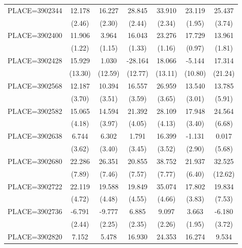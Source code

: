 {\begin{tabular}{l*{6}{c}}
PLACE=3902344       &      12.178&      16.227&      28.845&      33.910&      23.119&      25.437\\
                    &      (2.46)&      (2.30)&      (2.44)&      (2.34)&      (1.95)&      (3.74)\\
PLACE=3902400       &      11.906&       3.964&      16.043&      23.276&      17.729&      13.961\\
                    &      (1.22)&      (1.15)&      (1.33)&      (1.16)&      (0.97)&      (1.81)\\
PLACE=3902428       &      15.929&       1.030&     -28.164&      18.066&      -5.144&      17.314\\
                    &     (13.30)&     (12.59)&     (12.77)&     (13.11)&     (10.80)&     (21.24)\\
PLACE=3902568       &      12.187&      10.394&      16.557&      26.959&      13.540&      13.785\\
                    &      (3.70)&      (3.51)&      (3.59)&      (3.65)&      (3.01)&      (5.91)\\
PLACE=3902582       &      15.065&      14.594&      21.392&      28.109&      17.948&      24.564\\
                    &      (4.18)&      (3.97)&      (4.05)&      (4.13)&      (3.40)&      (6.68)\\
PLACE=3902638       &       6.744&       6.302&       1.791&      16.399&      -1.131&       0.017\\
                    &      (3.62)&      (3.40)&      (3.45)&      (3.52)&      (2.90)&      (5.68)\\
PLACE=3902680       &      22.286&      26.351&      20.855&      38.752&      21.937&      32.525\\
                    &      (7.89)&      (7.46)&      (7.57)&      (7.77)&      (6.40)&     (12.62)\\
PLACE=3902722       &      22.119&      19.588&      19.849&      35.074&      17.802&      19.834\\
                    &      (4.72)&      (4.48)&      (4.55)&      (4.66)&      (3.83)&      (7.53)\\
PLACE=3902736       &      -6.791&      -9.777&       6.885&       9.097&       3.663&      -6.180\\
                    &      (2.44)&      (2.25)&      (2.35)&      (2.26)&      (1.95)&      (3.72)\\
PLACE=3902820       &       7.152&       5.478&      16.930&      24.353&      16.274&       9.534\\

\end{tabular}}
